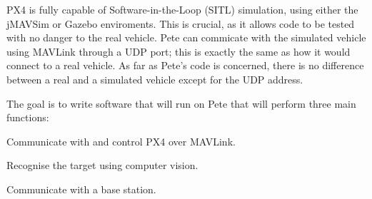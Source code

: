 \documentclass[11pt]{article}
\begin{document}
PX4 is fully capable of Software-in-the-Loop (SITL) simulation, using either the jMAVSim or Gazebo enviroments. This is crucial, as it allows code to be tested with no danger to the real vehicle. Pete can commicate with the simulated vehicle using MAVLink through a UDP port; this is exactly the same as how it would connect to a real vehicle. As far as Pete's code is concerned, there is no difference between a real and a simulated vehicle except for the UDP address.

The goal is to write software that will run on Pete that will perform three main functions:
\begin{compactenum}
    \item Communicate with and control PX4 over MAVLink.
    \item Recognise the target using computer vision.
    \item Communicate with a base station.
\end{compactenum}
\end{document}
